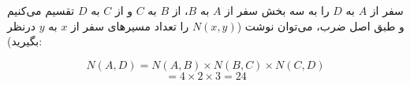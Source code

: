 \p
سفر از
$A$
به
$D$
را به سه بخش سفر از
$A$
به
$B$،
از
$B$
به
$C$
و از
$C$
به
$D$
تقسیم می‌کنیم و طبق اصل ضرب، می‌توان نوشت
($N(x,y)$ را تعداد مسیر‌های سفر از $x$ به $y$ درنظر بگیرید):

$$N(A,D) = N(A,B) \times N(B,C) \times N(C,D)$$
$$= 4 \times 2 \times 3 = 24$$